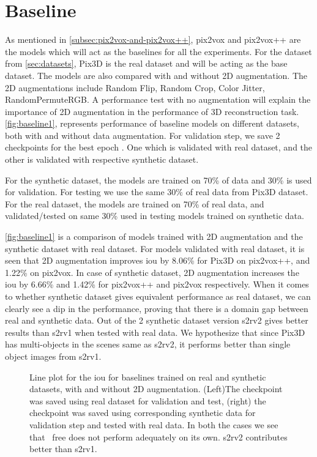 \section{Baseline}\label{sec:baseline}

As mentioned in \autoref{subsec:pix2vox-and-pix2vox++}, pix2vox and pix2vox++ are the models which will act as the baselines for all the experiments.
For the dataset from \autoref{sec:datasets}, Pix3D is the real dataset and will be acting as the base dataset.
The models are also compared with and without 2D augmentation.
The 2D augmentations include Random Flip, Random Crop, Color Jitter, RandomPermuteRGB.
A performance test with no augmentation will explain the importance of 2D augmentation in the performance of 3D reconstruction task.
\autoref{fig:baseline1}, represents performance of baseline models on different datasets, both with and without data augmentation.
For validation step, we save 2 checkpoints for the best epoch .
One which is validated with real dataset, and the other is validated with respective synthetic dataset.

For the synthetic dataset, the models are trained on 70\% of data and 30\% is used for validation.
For testing we use the same 30\% of real data from Pix3D dataset.
For the real dataset, the models are trained on 70\% of real data, and validated/tested on same 30\% used in testing models trained on synthetic data.

\autoref{fig:baseline1} is a comparison of models trained with 2D augmentation and the synthetic dataset with real dataset.
For models validated with real dataset, it is seen that 2D augmentation improves \gls{iou}  by 8.06\% for Pix3D on pix2vox++, and 1.22\% on pix2vox.
In case of synthetic dataset, 2D augmentation increases the \gls{iou}  by 6.66\% and 1.42\%  for pix2vox++ and pix2vox respectively.
When it comes to whether synthetic dataset gives equivalent performance as real dataset, we can clearly see a dip in the performance,
proving that there is a domain gap between real and synthetic data.
Out of the 2 synthetic dataset version \gls{s2rv2} gives better results than \gls{s2rv1} when tested with real data.
We hypothesize that since Pix3D has multi-objects in the scenes same as \gls{s2rv2}, it performs better than single object images from \gls{s2rv1}.

\begin{figure}
    \centering
    \resizebox{0.49\linewidth}{!}{}
    \resizebox{0.49\linewidth}{!}{}
    \caption{Line plot for the \gls{iou}  for baselines trained on real and synthetic datasets, with and without 2D augmentation.
        (Left)The checkpoint was saved using real dataset for validation and test, (right) the checkpoint was saved using corresponding synthetic data for validation step and tested with real data.
        In both the cases we see that ~\gls{free} does not perform adequately on its own. \gls{s2rv2} contributes better than \gls{s2rv1}.}
    \label{fig:baseline1}
\end{figure}

